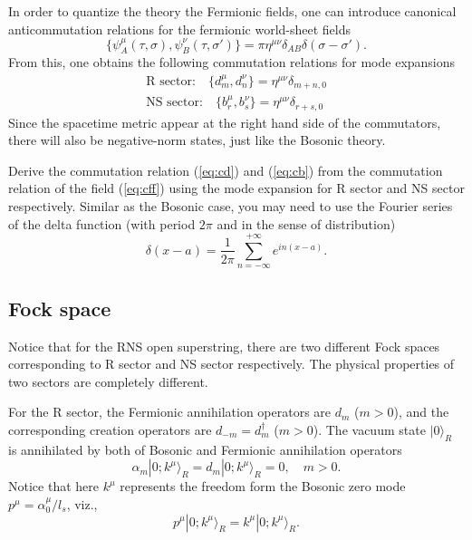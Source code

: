 \documentclass[graybox,envcountchap,sectrefs]{svmono}
\begin{document}
In order to quantize the theory the Fermionic fields, one can introduce canonical anticommutation relations for the fermionic world-sheet fields
\begin{equation}
\{\psi_A^{\mu}(\tau,\sigma),\psi_B^{\nu}(\tau,\sigma')\}	=\pi \eta^{\mu\nu}\delta_{AB}\delta(\sigma-\sigma'). \label{eq:cff}
\end{equation}
From this, one obtains the following commutation relations for mode expansions
\begin{align}
\text{R sector:}\quad \{d_m^{\mu},d_n^{\nu}\}=\eta^{\mu\nu}\delta_{m+n,0} \label{eq:cd}\\
\text{NS sector:}\quad \{b_r^{\mu},b_s^{\nu}\}=\eta^{\mu\nu}\delta_{r+s,0} \label{eq:cb}
\end{align}
Since the spacetime metric appear at the right hand side of the commutators, there will also be negative-norm states, just like the Bosonic theory.
\begin{exercise}
Derive the commutation relation	(\ref{eq:cd}) and (\ref{eq:cb}) from the commutation relation of the field (\ref{eq:cff}) using the mode expansion for R sector and NS sector respectively. Similar as the Bosonic case, you may need to use the Fourier series of the delta function (with period $2\pi$ and in the sense of distribution)
\begin{equation}
\delta\left(x-a\right)=\frac{1}{2\pi} \sum_{n=-\infty}^{+\infty} e^{ i n\left(x-a\right)}.
\end{equation}
\end{exercise}


\subsection{Fock space}

Notice that for the RNS open superstring, there are two different Fock spaces corresponding to R sector and NS sector respectively.
The physical properties of two sectors are completely different.

For the R sector, the Fermionic annihilation operators are $d_m$ ($m>0$), and the corresponding creation operators are $d_{-m}=d_{m}^{\dagger}$ ($m>0$).
The vacuum state $|0\rangle_R$ is annihilated by both of Bosonic and Fermionic annihilation operators
\begin{equation}
	\alpha_{m}|0;k^{\mu}\rangle_R = d_m |0;k^{\mu}\rangle_R =0, \quad  m>0.
\end{equation}
Notice that here $k^{\mu}$ represents the freedom form the Bosonic zero mode $p^{\mu}=\alpha_0^{\mu}/l_s$, viz., 
\begin{equation}
p^{\mu}|0;k^{\mu}\rangle_R=k^{\mu}|0;k^{\mu}\rangle_R.
\end{equation}
\end{document}

